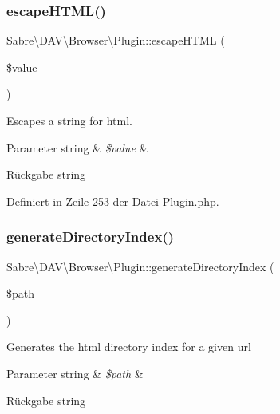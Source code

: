 \subsubsection{\texorpdfstring{escape\+H\+T\+M\+L()}{escapeHTML()}}
{\footnotesize\ttfamily Sabre\textbackslash{}\+D\+A\+V\textbackslash{}\+Browser\textbackslash{}\+Plugin\+::escape\+H\+T\+ML (\begin{DoxyParamCaption}\item[{}]{\$value }\end{DoxyParamCaption})}

Escapes a string for html.


\begin{DoxyParams}[1]{Parameter}
string & {\em \$value} & \\
\hline
\end{DoxyParams}
\begin{DoxyReturn}{Rückgabe}
string 
\end{DoxyReturn}


Definiert in Zeile 253 der Datei Plugin.\+php.

\mbox{\label{class_sabre_1_1_d_a_v_1_1_browser_1_1_plugin_ab1554e3e3d33a3856ca2854d600d0983}} 
\subsubsection{\texorpdfstring{generate\+Directory\+Index()}{generateDirectoryIndex()}}
{\footnotesize\ttfamily Sabre\textbackslash{}\+D\+A\+V\textbackslash{}\+Browser\textbackslash{}\+Plugin\+::generate\+Directory\+Index (\begin{DoxyParamCaption}\item[{}]{\$path }\end{DoxyParamCaption})}

Generates the html directory index for a given url


\begin{DoxyParams}[1]{Parameter}
string & {\em \$path} & \\
\hline
\end{DoxyParams}
\begin{DoxyReturn}{Rückgabe}
string 
\end{DoxyReturn}


